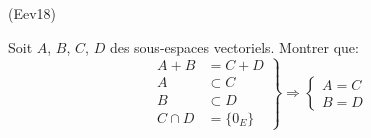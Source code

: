 \begin{tiny}(Eev18)\end{tiny} Soit $A$, $B$, $C$, $D$ des sous-espaces vectoriels. Montrer que:
\begin{displaymath}
 \left. 
\begin{aligned}
 A+B &= C+D \\ A &\subset C \\ B &\subset D \\ C\cap D &= \{0_E\}
\end{aligned}
\right\rbrace \Rightarrow
\left\lbrace 
\begin{aligned}
 A=C \\ B=D
\end{aligned}
\right. 
\end{displaymath}
